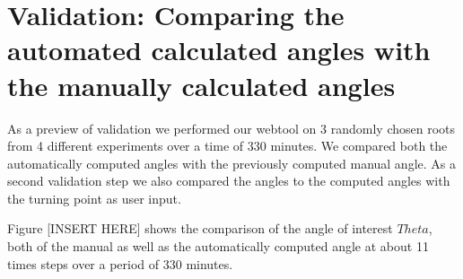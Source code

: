 \section{Validation: Comparing the automated calculated angles with the manually calculated angles}

As a preview of validation we performed our webtool on 3 randomly chosen roots from 4 different experiments over a time of 330 minutes. We compared both the automatically computed angles with the previously computed manual angle. As a second validation step we also compared the angles to the computed angles with the turning point as user input.

Figure [INSERT HERE] shows the comparison of the angle of interest \( Theta \), both of the manual as well as the automatically computed angle at about 11 times steps over a period of 330 minutes.





